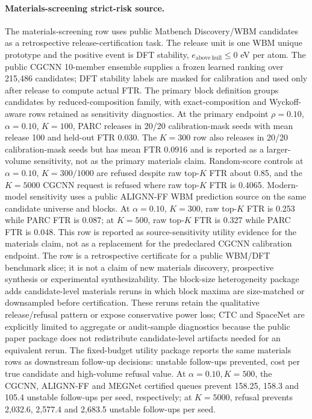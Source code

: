 \documentclass[11pt]{article}
\begin{document}
\paragraph{Materials-screening strict-risk source.}
The materials-screening row uses public Matbench Discovery/WBM candidates as a retrospective release-certification task.
The release unit is one WBM unique prototype and the positive event is DFT stability, \(e_{\mathrm{above\ hull}}\le 0\) eV per atom.
The public CGCNN 10-member ensemble supplies a frozen learned ranking over 215,486 candidates; DFT stability labels are masked for calibration and used only after release to compute actual FTR.
The primary block definition groups candidates by reduced-composition family, with exact-composition and Wyckoff-aware rows retained as sensitivity diagnostics.
At the primary endpoint \(\rho=0.10\), \(\alpha=0.10\), \(K=100\), PARC releases in 20/20 calibration-mask seeds with mean release 100 and held-out FTR 0.030.
The \(K=300\) row also releases in 20/20 calibration-mask seeds but has mean FTR 0.0916 and is reported as a larger-volume sensitivity, not as the primary materials claim.
Random-score controls at \(\alpha=0.10\), \(K=300/1000\) are refused despite raw top-\(K\) FTR about 0.85, and the \(K=5000\) CGCNN request is refused where raw top-\(K\) FTR is 0.4065.
Modern-model sensitivity uses a public ALIGNN-FF WBM prediction source on the same candidate universe and blocks.
At \(\alpha=0.10\), \(K=300\), raw top-\(K\) FTR is 0.253 while PARC FTR is 0.087; at \(K=500\), raw top-\(K\) FTR is 0.327 while PARC FTR is 0.048.
This row is reported as source-sensitivity utility evidence for the materials claim, not as a replacement for the predeclared CGCNN calibration endpoint.
The row is a retrospective certificate for a public WBM/DFT benchmark slice; it is not a claim of new materials discovery, prospective synthesis or experimental synthesizability.
The block-size heterogeneity package adds candidate-level materials reruns in which block maxima are size-matched or downsampled before certification.
These reruns retain the qualitative release/refusal pattern or expose conservative power loss; CTC and SpaceNet are explicitly limited to aggregate or audit-sample diagnostics because the public paper package does not redistribute candidate-level artifacts needed for an equivalent rerun.
The fixed-budget utility package reports the same materials rows as downstream follow-up decisions: unstable follow-ups prevented, cost per true candidate and high-volume refusal value.
At \(\alpha=0.10,K=500\), the CGCNN, ALIGNN-FF and MEGNet certified queues prevent 158.25, 158.3 and 105.4 unstable follow-ups per seed, respectively; at \(K=5000\), refusal prevents 2,032.6, 2,577.4 and 2,683.5 unstable follow-ups per seed.
\end{document}
